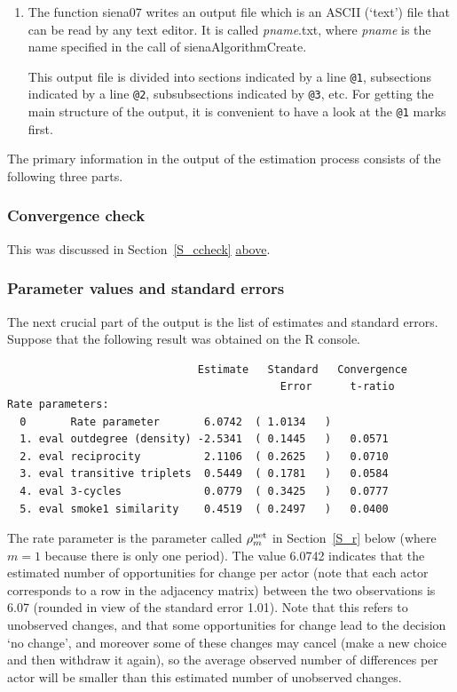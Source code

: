 \documentclass[a4paper,fleqn,11pt]{article}
\newcommand{\+}{\, + \,}
\newcommand{\R}{{\sf R }}
\begin{document}
\begin{enumerate}
  \item The function \textsf{siena07}
        writes an output file which is an ASCII (`text') file that can be
        read by any text editor.
        It is called \textsf{\textsl{pname}.txt},
        where \textsf{\textsl{pname}} is the name
        specified in the call of \textsf{sienaAlgorithmCreate}.

        This output file is divided into sections
        indicated by a line {\tt @1},
        subsections indicated by a line {\tt @2}, subsubsections indicated
        by {\tt @3}, etc. For getting the main structure of the output, it
        is convenient to have a look at the {\tt @1} marks first.
\end{enumerate}

The primary information in the output of the estimation process
consists of the following three parts.

\subsubsection{Convergence check}

This was discussed in Section~\ref{S_ccheck} \hyperlink{T_convergence}{above}.
\medskip

\subsubsection{Parameter values and standard errors}

The next crucial part of the output is the list of estimates and
standard errors. Suppose that the
following result was obtained on the \R console.

{\footnotesize
\begin{verbatim}
                              Estimate   Standard   Convergence
                                           Error      t-ratio
Rate parameters:
  0       Rate parameter       6.0742  ( 1.0134   )
  1. eval outdegree (density) -2.5341  ( 0.1445   )   0.0571
  2. eval reciprocity          2.1106  ( 0.2625   )   0.0710
  3. eval transitive triplets  0.5449  ( 0.1781   )   0.0584
  4. eval 3-cycles             0.0779  ( 0.3425   )   0.0777
  5. eval smoke1 similarity    0.4519  ( 0.2497   )   0.0400
\end{verbatim}
}

The rate parameter is the parameter called $ \rho^{\rm net}_m$
in Section~\ref{S_r} below (where $m=1$ because there is only one period).
The value 6.0742 indicates
that the estimated number of opportunities
for change per actor (note that each actor
corresponds to a row in the adjacency matrix)
between the two observations is
6.07 (rounded in view of the standard error 1.01). Note that this
refers to unobserved changes, and that some
opportunities for change lead to the decision `no change',
and moreover some of these changes may
cancel (make a new choice and then withdraw it again), so the
average observed number of differences per actor will be
smaller than this estimated number of unobserved changes.
\end{document}
